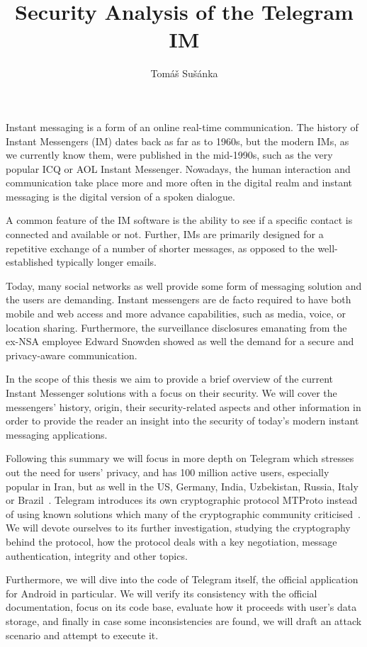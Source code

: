 \documentclass[thesis=M,english]{FITthesis}[2012/10/20]
\title{Security Analysis of the Telegram IM}
\author{Tom{\' a}{\v s} Su{\v s}{\' a}nka} %
\begin{document}
\begin{introduction}

Instant messaging is a form of an online real-time communication. The history of Instant Messengers (IM) dates back as far as to 1960s, but the modern IMs, as we currently know them, were published in the mid-1990s, such as the very popular ICQ or AOL Instant Messenger. Nowadays, the human interaction and communication take place more and more often in the digital realm and instant messaging is the digital version of a spoken dialogue.

A common feature of the IM software is the ability to see if a specific contact is connected and available or not. Further, IMs are primarily designed for a repetitive exchange of a number of shorter messages, as opposed to the well-established typically longer emails.

Today, many social networks as well provide some form of messaging solution and the users are demanding. Instant messengers are de facto required to have both mobile and web access and more advance capabilities, such as media, voice, or location sharing. Furthermore, the surveillance disclosures emanating from the ex-NSA employee Edward Snowden showed as well the demand for a secure and privacy-aware communication.

In the scope of this thesis we aim to provide a brief overview of the current Instant Messenger solutions with a focus on their security. We will cover the messengers' history, origin, their security-related aspects and other
information in order to provide the reader an insight into the security of
today's modern instant messaging applications.

Following this summary we will focus in more depth on Telegram which stresses out the need for users' privacy, and has 100 million active users, especially popular in Iran, but as well in the US, Germany, India, Uzbekistan, Russia, Italy or Brazil~\cite{telegram-countries}. Telegram introduces its own cryptographic protocol MTProto instead of using known solutions which many of the cryptographic community criticised~\cite{telegram-community-vice,telegram-community-register}. We will devote ourselves to its further investigation, studying the cryptography behind the protocol, how the protocol deals with a key negotiation, message authentication, integrity and other topics.

Furthermore, we will dive into the code of Telegram itself, the official application for Android in particular. We will verify its consistency with the official documentation, focus on its code base, evaluate how it proceeds with user's data storage, and finally in case some inconsistencies are found, we will draft an attack scenario and attempt to execute it.

\end{introduction}
\end{document}
